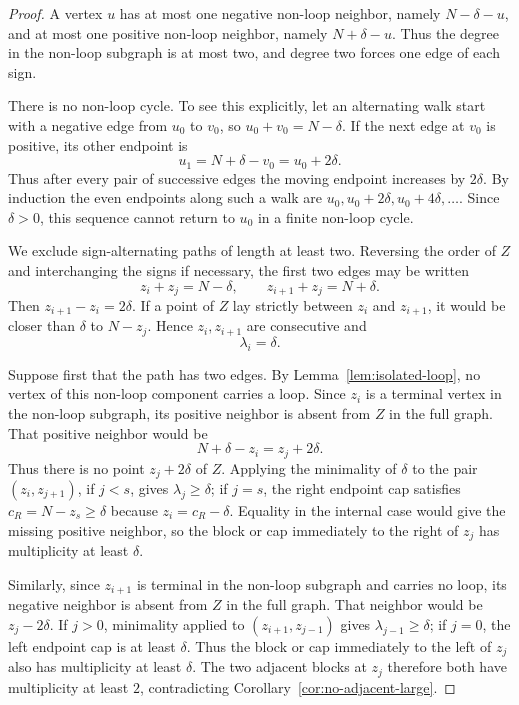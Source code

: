 \documentclass[11pt]{article}
\begin{document}
\begin{proof}
A vertex $u$ has at most one negative non-loop neighbor, namely $N-\delta-u$, and at most one positive non-loop neighbor, namely $N+\delta-u$.  Thus the degree in the non-loop subgraph is at most two, and degree two forces one edge of each sign.

There is no non-loop cycle.  To see this explicitly, let an alternating walk start with a negative edge from $u_0$ to $v_0$, so $u_0+v_0=N-\delta$.  If the next edge at $v_0$ is positive, its other endpoint is
\[
        u_1=N+\delta-v_0=u_0+2\delta.
\]
Thus after every pair of successive edges the moving endpoint increases by $2\delta$.  By induction the even endpoints along such a walk are $u_0,u_0+2\delta,u_0+4\delta,\ldots$.  Since $\delta>0$, this sequence cannot return to $u_0$ in a finite non-loop cycle.

We exclude sign-alternating paths of length at least two.  Reversing the order of $Z$ and interchanging the signs if necessary, the first two edges may be written
\[
        z_i+z_j=N-\delta,
        \qquad
        z_{i+1}+z_j=N+\delta .
\]
Then $z_{i+1}-z_i=2\delta$.  If a point of $Z$ lay strictly between $z_i$ and $z_{i+1}$, it would be closer than $\delta$ to $N-z_j$.  Hence $z_i,z_{i+1}$ are consecutive and
\[
        \lambda_i=\delta.
\]

Suppose first that the path has two edges.  By Lemma~\ref{lem:isolated-loop}, no vertex of this non-loop component carries a loop.  Since $z_i$ is a terminal vertex in the non-loop subgraph, its positive neighbor is absent from $Z$ in the full graph.  That positive neighbor would be
\[
        N+\delta-z_i=z_j+2\delta.
\]
Thus there is no point $z_j+2\delta$ of $Z$.  Applying the minimality of $\delta$ to the pair $(z_i,z_{j+1})$, if $j<s$, gives $\lambda_j\ge\delta$; if $j=s$, the right endpoint cap satisfies $c_R=N-z_s\ge\delta$ because $z_i=c_R-\delta$.  Equality in the internal case would give the missing positive neighbor, so the block or cap immediately to the right of $z_j$ has multiplicity at least $\delta$.

Similarly, since $z_{i+1}$ is terminal in the non-loop subgraph and carries no loop, its negative neighbor is absent from $Z$ in the full graph.  That neighbor would be $z_j-2\delta$.  If $j>0$, minimality applied to $(z_{i+1},z_{j-1})$ gives $\lambda_{j-1}\ge\delta$; if $j=0$, the left endpoint cap is at least $\delta$.  Thus the block or cap immediately to the left of $z_j$ also has multiplicity at least $\delta$.  The two adjacent blocks at $z_j$ therefore both have multiplicity at least $2$, contradicting Corollary~\ref{cor:no-adjacent-large}.


\end{proof}
\end{document}

